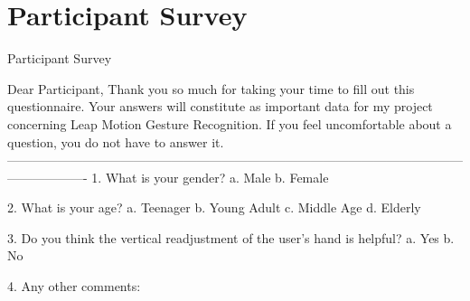 \chapter{Participant Survey}

\label{Appendix_survey} 
Participant Survey

Dear Participant, 
Thank you so much for taking your time to fill out this questionnaire. Your answers will constitute as important data for my project concerning Leap Motion Gesture Recognition. If you feel uncomfortable about a question, you do not have to answer it. 
-------------------------------------------------------------------------------------------------------------------------------
    1. What is your gender? 
        a. Male 
        b. Female

    2. What is your age?
        a. Teenager
        b. Young Adult 
        c. Middle Age
        d. Elderly

    3. Do you think the vertical readjustment of the user’s hand is helpful?
        a. Yes
        b. No

    4. Any other comments: